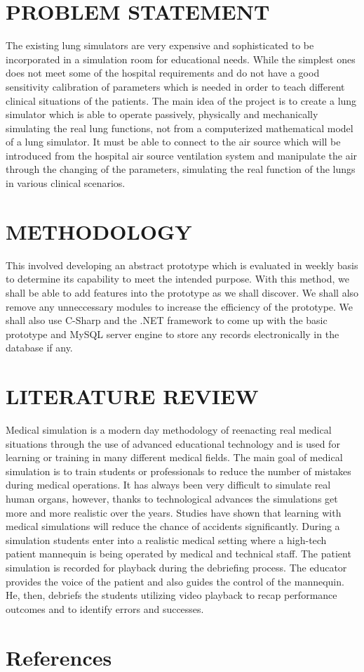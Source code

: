 \documentclass[14pt]{article}
\begin{document}
\section{PROBLEM STATEMENT}
The existing lung simulators are very expensive and sophisticated to be incorporated in a simulation room for educational needs. While the simplest ones does not meet some of the hospital requirements and do not have a good sensitivity calibration of parameters which is needed in order to teach different clinical situations of the patients.
The main idea of the project is to create a lung simulator which is able to operate passively, physically and mechanically simulating the real lung functions, not from a computerized mathematical model of a lung simulator. It must be able to connect to the air source which will be introduced from the hospital air source ventilation system and manipulate the air through the changing of the parameters, simulating the real function of the lungs in various clinical scenarios.

\section{METHODOLOGY}
This involved developing an abstract prototype which is evaluated in weekly basis to determine its capability to meet the intended purpose. With this method, we shall be able to add features into the prototype as we shall discover. We shall also remove any unneccessary modules to increase the efficiency of the prototype. We shall also use C-Sharp and the .NET framework to come up with the basic prototype and MySQL server engine to store any records electronically in the database if any.

\section{LITERATURE REVIEW}
Medical simulation is a modern day methodology of reenacting real medical situations through the use of advanced educational technology and is used for learning or training in many different medical fields. The main goal of medical simulation is to train students or professionals to reduce the number of mistakes during medical operations. It has always been very difficult to simulate real human organs, however, thanks to technological advances the simulations get more and more realistic over the years. Studies have shown that learning with medical simulations will reduce the chance of accidents significantly.
During a simulation students enter into a realistic medical setting where a high-tech patient mannequin is being operated by medical and technical staff. The patient simulation is recorded for playback during the debriefing process. The educator provides the voice of the patient and also guides the control of the mannequin. He, then, debriefs the students utilizing video playback to recap performance outcomes and to identify errors and successes.

\section{References}




\end{document}
